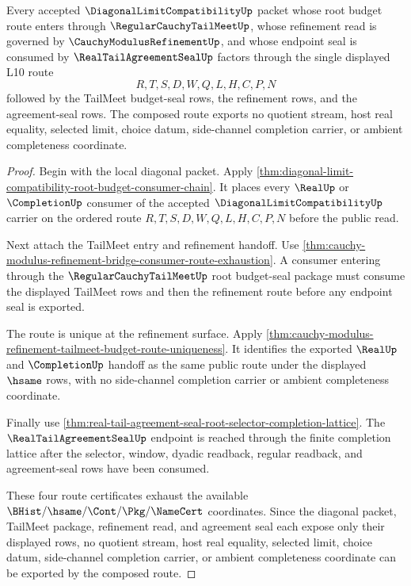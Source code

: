 \begin{theorem}
\label{thm:diagonal-limit-compatibility-tailmeet-refinement-seal-route}
Every accepted $\DiagonalLimitCompatibilityUp$ packet whose root budget route
enters through $\RegularCauchyTailMeetUp$, whose refinement read is governed by
$\CauchyModulusRefinementUp$, and whose endpoint seal is consumed by
$\RealTailAgreementSealUp$ factors through the single displayed L10 route
$$
R,T,S,D,W,Q,L,H,C,P,N
$$
followed by the TailMeet budget-seal rows, the refinement rows, and the
agreement-seal rows. The composed route exports no quotient stream, host real
equality, selected limit, choice datum, side-channel completion carrier, or
ambient completeness coordinate.
\end{theorem}
\begin{proof}
Begin with the local diagonal packet. Apply
\autoref{thm:diagonal-limit-compatibility-root-budget-consumer-chain}. It
places every $\RealUp$ or $\CompletionUp$ consumer of the accepted
$\DiagonalLimitCompatibilityUp$ carrier on the ordered route
$R,T,S,D,W,Q,L,H,C,P,N$ before the public read.

Next attach the TailMeet entry and refinement handoff. Use
\autoref{thm:cauchy-modulus-refinement-bridge-consumer-route-exhaustion}. A
consumer entering through the $\RegularCauchyTailMeetUp$ root budget-seal
package must consume the displayed TailMeet rows and then the refinement route
before any endpoint seal is exported.

The route is unique at the refinement surface. Apply
\autoref{thm:cauchy-modulus-refinement-tailmeet-budget-route-uniqueness}. It
identifies the exported $\RealUp$ and $\CompletionUp$ handoff as the same
public route under the displayed $\hsame$ rows, with no side-channel completion
carrier or ambient completeness coordinate.

Finally use
\autoref{thm:real-tail-agreement-seal-root-selector-completion-lattice}. The
$\RealTailAgreementSealUp$ endpoint is reached through the finite completion
lattice after the selector, window, dyadic readback, regular readback, and
agreement-seal rows have been consumed.

These four route certificates exhaust the available
$\BHist/\hsame/\Cont/\Pkg/\NameCert$ coordinates. Since the diagonal packet,
TailMeet package, refinement read, and agreement seal each expose only their
displayed rows, no quotient stream, host real equality, selected limit, choice
datum, side-channel completion carrier, or ambient completeness coordinate can
be exported by the composed route.
\end{proof}

